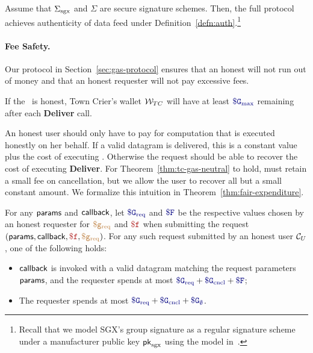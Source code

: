 \vspace{2mm}
\begin{theorem}[Authenticity]
\label{thm:authenticity}
Assume that ${\Sigma_{\textrm{sgx}}}$
and $\Sigma$ are secure signature schemes.
Then, the full \tc
protocol achieves authenticity of data feed under Definition~\ref{defn:auth}.\footnote{Recall
that we
model SGX's group signature as a regular signature
scheme under a manufacturer public key ${\sf pk}_{\mathrm{sgx}}$ using the model in~\cite{sgxsok}.}
\end{theorem}




\paragraph{Fee Safety.}
Our protocol in Section~\ref{sec:gas-protocol} ensures that an honest \tcs will not run out of money
and that an honest requester will not pay excessive fees.

\begin{theorem}
\label{thm:tc-gas-neutral}
If the \tc~\medname is honest,
Town Crier's wallet ${\cal W}_{TC}$ will have at least $\constgasmax$ remaining after each {\bf Deliver} call.
\end{theorem}

An honest user should only have to pay for computation that is executed honestly on her behalf.
If a valid datagram is delivered, this is a constant value plus the cost of executing \dgcallback.
Otherwise the request should be able to recover the cost of executing {\bf Deliver}.
For Theorem~\ref{thm:tc-gas-neutral} to hold, \tcont must retain a small fee on cancellation,
but we allow the user to recover all but a small constant amount.
We formalize this intuition in Theorem~\ref{thm:fair-expenditure}.

\begin{theorem}
\label{thm:fair-expenditure}
For any ${\sf params}$ and ${\sf callback}$,
let $\constgasrequest$ and $\consthonestfee$ be the respective values chosen by an honest requester for $\textcolor{brown}{\tt \$g_\text{req}}$ and $\fee$
when submitting the request $(\dgform, \dgcallback, \fee, \gasrequest)$.
For any such request submitted by an honest user ${\cal C}_U$, one of the following holds:
\begin{itemize}
  \setlength{\itemsep}{2pt}
  \setlength{\parskip}{0pt}
  \setlength{\parsep}{0pt}
  \item ${\sf callback}$ is invoked with a valid datagram matching the request parameters ${\sf params}$,
    and the requester spends at most $\constgasrequest + \constgasinvokecancel + \consthonestfee$;

  \item The requester spends at most $\constgasrequest + \constgasinvokecancel + \constgascancel$.
\end{itemize}
\end{theorem}





